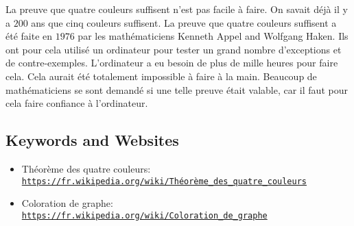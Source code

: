 \documentclass[a4paper,11pt]{report}
\newcommand{\BrochureUrlText}[1]{\texttt{#1}}
\begin{document}
La preuve que quatre couleurs suffisent n’est pas facile à faire. On savait déjà il y a $200$ ans que cinq couleurs suffisent. La preuve que quatre couleurs suffisent a été faite en $1976$ par les mathématiciens Kenneth Appel and Wolfgang Haken. Ils ont pour cela utilisé un ordinateur pour tester un grand nombre d’exceptions et de contre-exemples. L’ordinateur a eu besoin de plus de mille heures pour faire cela. Cela aurait été totalement impossible à faire à la main. Beaucoup de mathématiciens se sont demandé si une telle preuve était valable, car il faut pour cela faire confiance à l’ordinateur.

{\raggedright

\subsection*{Keywords and Websites}

\begin{itemize}
  \item Théorème des quatre couleurs: \href{https://fr.wikipedia.org/wiki/Th\%C3\%A9or\%C3\%A8me_des_quatre_couleurs}{\BrochureUrlText{https://fr.wikipedia.org/wiki/Théorème\_des\_quatre\_couleurs}}
  \item Coloration de graphe: \href{https://fr.wikipedia.org/wiki/Coloration_de_graphe}{\BrochureUrlText{https://fr.wikipedia.org/wiki/Coloration\_de\_graphe}}
\end{itemize}


}
\end{document}
